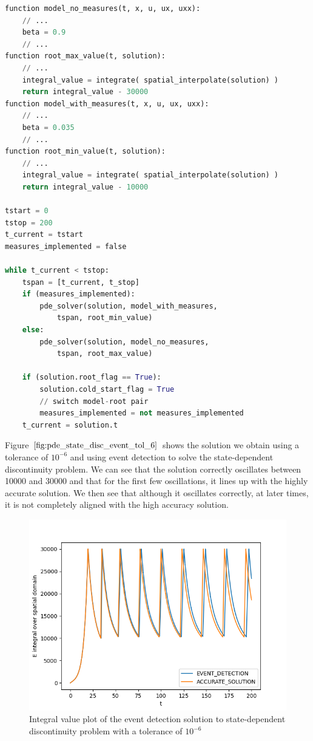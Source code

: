 \documentclass{article}
\begin{document}
\begin{minipage}{\linewidth}
\begin{lstlisting}[language=Python]
function model_no_measures(t, x, u, ux, uxx):
	// ...
	beta = 0.9
	// ...
function root_max_value(t, solution):
	// ...
	integral_value = integrate( spatial_interpolate(solution) )
	return integral_value - 30000
function model_with_measures(t, x, u, ux, uxx):
	// ...
	beta = 0.035
	// ...
function root_min_value(t, solution):
	// ...
	integral_value = integrate( spatial_interpolate(solution) )
	return integral_value - 10000

tstart = 0
tstop = 200
t_current = tstart
measures_implemented = false

while t_current < tstop:
	tspan = [t_current, t_stop]
	if (measures_implemented):
		pde_solver(solution, model_with_measures, 
			tspan, root_min_value)
	else:
		pde_solver(solution, model_no_measures, 
			tspan, root_max_value)
	
	if (solution.root_flag == True):
		solution.cold_start_flag = True
		// switch model-root pair
		measures_implemented = not measures_implemented
	t_current = solution.t

\end{lstlisting}
\end{minipage}

Figure $\ref{fig:pde_state_disc_event_tol_6}$ shows the solution we obtain using a tolerance of $10^{-6}$ and using event detection to solve the state-dependent discontinuity problem. We can see that the solution correctly oscillates between 10000 and 30000 and that for the first few oscillations, it lines up with the highly accurate solution. We then see that although it oscillates correctly, at later times, it is not completely aligned with the high accuracy solution. 

\begin{figure}[H]
\centering
\includegraphics[width=0.7\linewidth]{./figures/pde_state_disc_event_tol_6}
\caption{Integral value plot of the event detection solution to state-dependent discontinuity problem with a tolerance of $10^{-6}$}
\label{fig:pde_state_disc_event_tol_6}
\end{figure}
\end{document}
